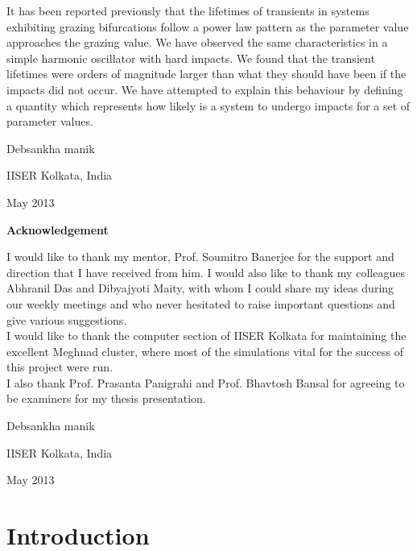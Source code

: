 \documentclass[oneside]{book}
\renewcommand{\(}{\begin{columns}}
\renewcommand{\)}{\end{columns}}
\newcommand{\<}[1]{\begin{column}{#1}}
\renewcommand{\>}{\end{column}}
\begin{document}
It has been reported previously that the lifetimes of transients in  systems 
exhibiting grazing bifurcations follow a power law pattern as the parameter 
value approaches the grazing value.  We have observed the same characteristics 
in a simple harmonic oscillator with hard impacts. We found that the transient 
lifetimes were orders of magnitude larger than what they should have been
if the impacts did not occur.   We have attempted to explain this 
behaviour by defining a quantity which represents how likely is a system to 
undergo impacts for a set of parameter values.  

\vspace{4em}
\hfill Debsankha manik

\hfill IISER Kolkata, India

\hfill May 2013

\newpage

\begin{center}
{\LARGE {\bf Acknowledgement}}
\end{center}
\vspace{0.3in}
I would like to thank my mentor, Prof. Soumitro Banerjee for the support and direction that I have received from him. I would also like to thank my colleagues Abhranil Das and Dibyajyoti Maity, with whom I could share my ideas during our weekly meetings and who never hesitated to raise important questions and give various suggestions. \\


I would like to thank the computer section of IISER Kolkata for maintaining the excellent Meghnad cluster, where most of the simulations vital for the success of this project were run. \\


I also thank Prof. Prasanta Panigrahi and Prof. Bhavtosh Bansal for agreeing to be examiners for my thesis presentation.\\
\vspace{4em}

\hfill Debsankha manik

\hfill IISER Kolkata, India

\hfill May 2013


\thispagestyle{plain}



\tableofcontents

\mainmatter
\chapter{Introduction}
\end{document}
